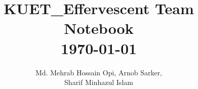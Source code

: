\documentclass[8pt, a4paper, onesided]{article}
\title{\vspace{-2.5ex}\Large{KUET\_Effervescent Team Notebook\\\today}}
\author{Md. Mehrab Hossain Opi, Arnob Sarker,\\Sharif Minhazul Islam}
\date{}
\begin{document}
\begin{landscape}
\begin{multicols*}{3}

\maketitle
\vspace{-7ex}
\pagestyle{fancy}
 
\raggedbottom

\end{multicols*}
%

\end{landscape}
\end{document}
